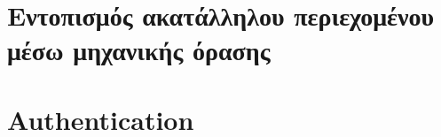 \documentclass[../thesis.tex]{subfiles}
\begin{document}
\section*{Εντοπισμός ακατάλληλου περιεχομένου μέσω μηχανικής όρασης}


\section*{Authentication}
\label{sec:authentication}

\end{document}

